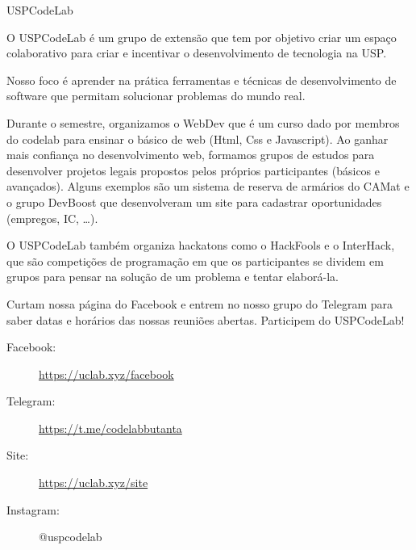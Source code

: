 \begin{subsecao}{USPCodeLab}


O USPCodeLab é um grupo de extensão que tem por objetivo criar um espaço
colaborativo para criar e incentivar o desenvolvimento de tecnologia na USP.

Nosso foco é aprender na prática ferramentas e técnicas de desenvolvimento de software que permitam
solucionar problemas do mundo real.

Durante o semestre, organizamos o WebDev que é um curso dado por membros do codelab para ensinar o
básico de web (Html, Css e Javascript). Ao ganhar mais confiança no desenvolvimento web, formamos
grupos de estudos para desenvolver projetos legais propostos pelos próprios participantes (básicos
e avançados). Alguns exemplos são um sistema de reserva de armários do CAMat e o grupo DevBoost que
desenvolveram um site para cadastrar oportunidades (empregos, IC, \dots). 

O USPCodeLab também organiza hackatons como o HackFools e o InterHack, que são competições de
programação em que os participantes se dividem em grupos para pensar na solução de um problema e tentar
elaborá-la.

Curtam nossa página do Facebook e entrem no nosso grupo do Telegram para saber
datas e horários das nossas reuniões abertas. Participem do USPCodeLab!

\begin{description}
\item[Facebook:] \url{https://uclab.xyz/facebook}
\item[Telegram:] \url{https://t.me/codelabbutanta}
\item[Site:] \url{https://uclab.xyz/site}
\item[Instagram:] @uspcodelab
\end{description}

\end{subsecao}
